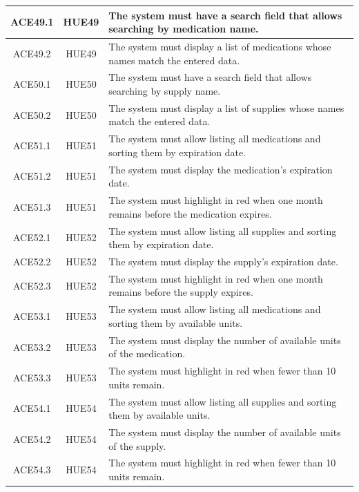 \documentclass{prgrado}
\begin{document}
\begin{longtable}{|c|c|p{9cm}|}
ACE49.1 & HUE49 & The system must have a search field that allows searching by medication name. \\ \hline
ACE49.2 & HUE49 & The system must display a list of medications whose names match the entered data. \\ \hline

ACE50.1 & HUE50 & The system must have a search field that allows searching by supply name. \\ \hline
ACE50.2 & HUE50 & The system must display a list of supplies whose names match the entered data. \\ \hline

ACE51.1 & HUE51 & The system must allow listing all medications and sorting them by expiration date. \\ \hline
ACE51.2 & HUE51 & The system must display the medication's expiration date. \\ \hline
ACE51.3 & HUE51 & The system must highlight in red when one month remains before the medication expires. \\ \hline

ACE52.1 & HUE52 & The system must allow listing all supplies and sorting them by expiration date. \\ \hline
ACE52.2 & HUE52 & The system must display the supply's expiration date. \\ \hline
ACE52.3 & HUE52 & The system must highlight in red when one month remains before the supply expires. \\ \hline

ACE53.1 & HUE53 & The system must allow listing all medications and sorting them by available units. \\ \hline
ACE53.2 & HUE53 & The system must display the number of available units of the medication. \\ \hline
ACE53.3 & HUE53 & The system must highlight in red when fewer than 10 units remain. \\ \hline

ACE54.1 & HUE54 & The system must allow listing all supplies and sorting them by available units. \\ \hline
ACE54.2 & HUE54 & The system must display the number of available units of the supply. \\ \hline
ACE54.3 & HUE54 & The system must highlight in red when fewer than 10 units remain. \\ \hline


\end{longtable}
\end{document}
